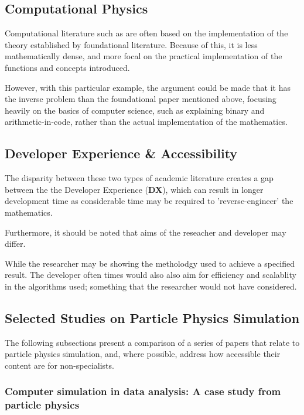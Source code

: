 \subsection{Computational Physics}

Computational literature such as  are often based on the implementation of the 
theory established by foundational literature. Because of this, it is less mathematically dense, and more focal on the practical
implementation of the functions and concepts introduced.

However, with this particular example, the argument could be made that it has the inverse problem than the foundational paper mentioned above,
focusing heavily on the basics of computer science, such as explaining binary and arithmetic-in-code, rather than the actual implementation of the mathematics.

\subsection{Developer Experience \& Accessibility}

The disparity between these two types of academic literature creates a gap between the the Developer Experience (\textbf{DX}), which can
result in longer development time as considerable time may be required to 'reverse-engineer' the mathematics.

Furthermore, it should be noted that aims of the reseacher and developer may differ.

While the researcher may be showing the metholodgy used to achieve a specified result. The developer often times would also
also aim for efficiency and scalablity in the algorithms used; something that the researcher would not have considered.

\subsection{Selected Studies on Particle Physics Simulation}

The following subsections present a comparison of a series of papers that relate to particle physics simulation, and, where possible,
address how accessible their content are for non-specialists.

\subsubsection*{Computer simulation in data analysis: A case study from particle physics}

